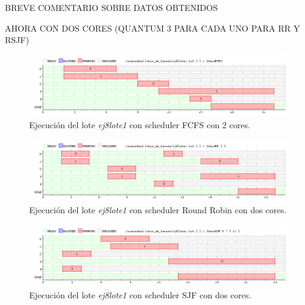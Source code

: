 BREVE COMENTARIO SOBRE DATOS OBTENIDOS

AHORA CON DOS CORES (QUANTUM 3 PARA CADA UNO PARA RR Y RSJF)

\begin{figure}[!h]
	\begin{center}
		\includegraphics[width=500px]{imagenes/ej8_prueba1_fcfs2.png}
		\caption{Ejecución del lote \emph{ej8lote1} con scheduler FCFS con 2 cores.}
		\label{fig:grafico_ej8_prueba1_fcfs2}
	\end{center}
\end{figure}

\newpage

\begin{figure}[!h]
	\begin{center}
		\includegraphics[width=500px]{imagenes/ej8_prueba1_rr2.png}
		\caption{Ejecución del lote \emph{ej8lote1} con scheduler Round Robin con dos cores.}
		\label{fig:grafico_ej8_prueba1_rr2}
	\end{center}
\end{figure}

\begin{figure}[!h]
	\begin{center}
		\includegraphics[width=500px]{imagenes/ej8_prueba1_sjf2.png}
		\caption{Ejecución del lote \emph{ej8lote1} con scheduler SJF con dos cores.}
		\label{fig:grafico_ej8_prueba1_sjf2}
	\end{center}
\end{figure}

